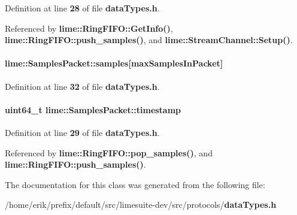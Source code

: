 Definition at line {\bf 28} of file {\bf data\+Types.\+h}.



Referenced by {\bf lime\+::\+Ring\+F\+I\+F\+O\+::\+Get\+Info()}, {\bf lime\+::\+Ring\+F\+I\+F\+O\+::push\+\_\+samples()}, and {\bf lime\+::\+Stream\+Channel\+::\+Setup()}.

\paragraph[{samples}]{ lime\+::\+Samples\+Packet\+::samples[{\bf max\+Samples\+In\+Packet}]}\label{classlime_1_1SamplesPacket_a0480a3a91b726a45099ef587e45efc0f}


Definition at line {\bf 32} of file {\bf data\+Types.\+h}.

\paragraph[{timestamp}]{\setlength{\rightskip}{0pt plus 5cm}uint64\+\_\+t lime\+::\+Samples\+Packet\+::timestamp}\label{classlime_1_1SamplesPacket_ab733014b8dfe33165392343566d58830}


Definition at line {\bf 29} of file {\bf data\+Types.\+h}.



Referenced by {\bf lime\+::\+Ring\+F\+I\+F\+O\+::pop\+\_\+samples()}, and {\bf lime\+::\+Ring\+F\+I\+F\+O\+::push\+\_\+samples()}.



The documentation for this class was generated from the following file\+:\begin{DoxyCompactItemize}
\item 
/home/erik/prefix/default/src/limesuite-\/dev/src/protocols/{\bf data\+Types.\+h}\end{DoxyCompactItemize}
